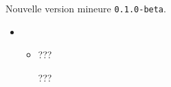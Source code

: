 Nouvelle version mineure \verb+0.1.0-beta+.

\begin{itemize}[itemsep=.5em]
    \item {}
    \begin{itemize}[itemsep=.5em]
        \item ???

              \smallskip

              ???
    \end{itemize}





    \separation
\end{itemize}